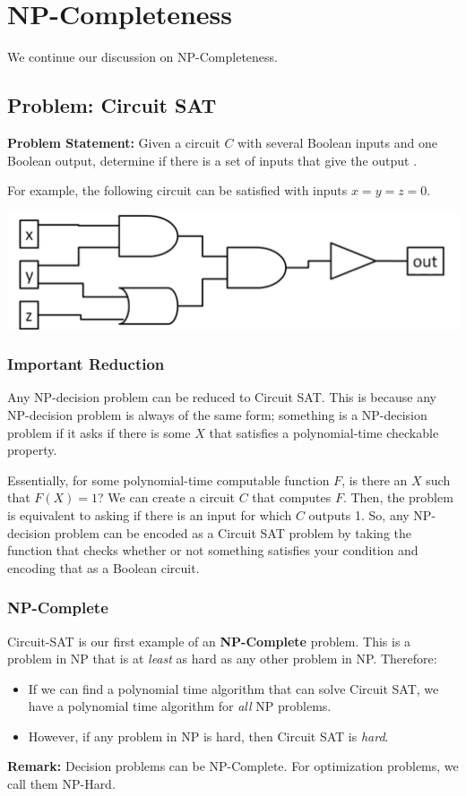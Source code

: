 \documentclass[letterpaper]{article}
\begin{document}
\section{NP-Completeness}
We continue our discussion on NP-Completeness. 

\subsection{Problem: Circuit SAT}
\textbf{Problem Statement:} Given a circuit $C$ with several Boolean inputs and one Boolean output, determine if there is a set of inputs that give the output . 

\bigskip 

For example, the following circuit can be satisfied with inputs $x = y = z = 0$.
\begin{center}
    \includegraphics[scale=0.5]{../assets/circuit_sat.png}
\end{center}

\subsubsection{Important Reduction}
Any NP-decision problem can be reduced to Circuit SAT. This is because any NP-decision problem is always of the same form; something is a NP-decision problem if it asks if there is some $X$ that satisfies a polynomial-time checkable property. 

\bigskip 

Essentially, for some polynomial-time computable function $F$, is there an $X$ such that $F(X) = 1$? We can create a circuit $C$ that computes $F$. Then, the problem is equivalent to asking if there is an input for which $C$ outputs 1. So, any NP-decision problem can be encoded as a Circuit SAT problem by taking the function that checks whether or not something satisfies your condition and encoding that as a Boolean circuit. 

\subsubsection{NP-Complete}
Circuit-SAT is our first example of an \textbf{NP-Complete} problem. This is a problem in NP that is at \emph{least} as hard as any other problem in NP. Therefore: 
\begin{itemize}
    \item If we can find a polynomial time algorithm that can solve Circuit SAT, we have a polynomial time algorithm for \emph{all} NP problems. 
    \item However, if any problem in NP is hard, then Circuit SAT is \emph{hard}.
\end{itemize}
\textbf{Remark:} Decision problems can be NP-Complete. For optimization problems, we call them NP-Hard.
\end{document}
